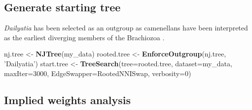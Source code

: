 \documentclass[]{book}
\newenvironment{Shaded}{\begin{snugshade}}{\end{snugshade}}
\newcommand{\KeywordTok}[1]{\textcolor[rgb]{0.13,0.29,0.53}{\textbf{#1}}}
\newcommand{\DataTypeTok}[1]{\textcolor[rgb]{0.13,0.29,0.53}{#1}}
\newcommand{\DecValTok}[1]{\textcolor[rgb]{0.00,0.00,0.81}{#1}}
\newcommand{\StringTok}[1]{\textcolor[rgb]{0.31,0.60,0.02}{#1}}
\newcommand{\NormalTok}[1]{#1}
\theoremstyle{definition}
\theoremstyle{definition}
\theoremstyle{definition}
\theoremstyle{remark}
\begin{document}
\hypertarget{generate-starting-tree}{%
\subsection{Generate starting tree}\label{generate-starting-tree}}

\emph{Dailyatia} has been selected as an outgroup as camenellans have
been interpreted as the earliest diverging members of the Brachiozoa
\citep{Skovsted2015, Zhao2017}.

\begin{Shaded}
\begin{Highlighting}[]
\NormalTok{nj.tree <-}\StringTok{ }\KeywordTok{NJTree}\NormalTok{(my_data)}
\NormalTok{rooted.tree <-}\StringTok{ }\KeywordTok{EnforceOutgroup}\NormalTok{(nj.tree, }\StringTok{'Dailyatia'}\NormalTok{)}
\NormalTok{start.tree <-}\StringTok{ }\KeywordTok{TreeSearch}\NormalTok{(}\DataTypeTok{tree=}\NormalTok{rooted.tree, }\DataTypeTok{dataset=}\NormalTok{my_data, }\DataTypeTok{maxIter=}\DecValTok{3000}\NormalTok{,}
                         \DataTypeTok{EdgeSwapper=}\NormalTok{RootedNNISwap, }\DataTypeTok{verbosity=}\DecValTok{0}\NormalTok{)}
\end{Highlighting}
\end{Shaded}

\hypertarget{implied-weights-analysis}{%
\subsection{Implied weights analysis}\label{implied-weights-analysis}}
\end{document}
